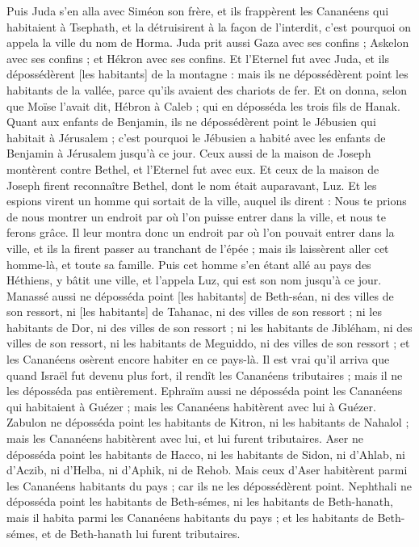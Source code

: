 \begin{multicols}{2}
Puis Juda s'en alla avec Siméon son frère, et ils frappèrent les Cananéens qui habitaient à Tsephath, et la détruisirent à la façon de l'interdit, c'est pourquoi on appela la ville du nom de Horma.
Juda prit aussi Gaza avec ses confins ; Askelon avec ses confins ; et Hékron avec ses confins.
Et l'Eternel fut avec Juda, et ils dépossédèrent [les habitants] de la montagne : mais ils ne dépossédèrent point les habitants de la vallée, parce qu'ils avaient des chariots de fer.
Et on donna, selon que Moïse l'avait dit, Hébron à Caleb ; qui en déposséda les trois fils de Hanak.
Quant aux enfants de Benjamin, ils ne dépossédèrent point le Jébusien qui habitait à Jérusalem ; c'est pourquoi le Jébusien a habité avec les enfants de Benjamin à Jérusalem jusqu'à ce jour.
Ceux aussi de la maison de Joseph montèrent contre Bethel, et l'Eternel fut avec eux.
Et ceux de la maison de Joseph firent reconnaître Bethel, dont le nom était auparavant, Luz.
Et les espions virent un homme qui sortait de la ville, auquel ils dirent : Nous te prions de nous montrer un endroit par où l'on puisse entrer dans la ville, et nous te ferons grâce.
Il leur montra donc un endroit par où l'on pouvait entrer dans la ville, et ils la firent passer au tranchant de l'épée ; mais ils laissèrent aller cet homme-là, et toute sa famille.
Puis cet homme s'en étant allé au pays des Héthiens, y bâtit une ville, et l'appela Luz, qui est son nom jusqu'à ce jour.
Manassé aussi ne déposséda point [les habitants] de Beth-séan, ni des villes de son ressort, ni [les habitants] de Tahanac, ni des villes de son ressort ; ni les habitants de Dor, ni des villes de son ressort ; ni les habitants de Jibléham, ni des villes de son ressort, ni les habitants de Meguiddo, ni des villes de son ressort ; et les Cananéens osèrent encore habiter en ce pays-là.
Il est vrai qu'il arriva que quand Israël fut devenu plus fort, il rendît les Cananéens tributaires ; mais il ne les déposséda pas entièrement.
Ephraïm aussi ne déposséda point les Cananéens qui habitaient à Guézer ; mais les Cananéens habitèrent avec lui à Guézer.
Zabulon ne déposséda point les habitants de Kitron, ni les habitants de Nahalol ; mais les Cananéens habitèrent avec lui, et lui furent tributaires.
Aser ne déposséda point les habitants de Hacco, ni les habitants de Sidon, ni d'Ahlab, ni d'Aczib, ni d'Helba, ni d'Aphik, ni de Rehob.
Mais ceux d'Aser habitèrent parmi les Cananéens habitants du pays ; car ils ne les dépossédèrent point.
Nephthali ne déposséda point les habitants de Beth-sémes, ni les habitants de Beth-hanath, mais il habita parmi les Cananéens habitants du pays ; et les habitants de Beth-sémes, et de Beth-hanath lui furent tributaires.

\end{multicols}

